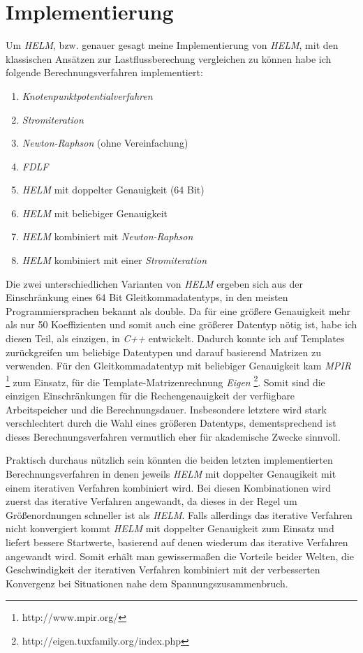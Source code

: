 \documentclass[12pt,a4paper]{article}
\begin{document}
	\section{Implementierung}
	\label{sec:implementierung}
	
	Um \emph{HELM}, bzw. genauer gesagt meine Implementierung von \emph{HELM}, mit den klassischen Ansätzen zur Lastflussberechung vergleichen zu können habe ich folgende Berechnungsverfahren implementiert:
	\begin{enumerate}
		\item \emph{Knotenpunktpotentialverfahren}
		\item \emph{Stromiteration}
		\item \emph{Newton-Raphson} (ohne Vereinfachung)
		\item \emph{FDLF}
		\item \emph{HELM} mit doppelter Genauigkeit (64 Bit)
		\item \emph{HELM} mit beliebiger Genauigkeit
		\item \emph{HELM} kombiniert mit \emph{Newton-Raphson}
		\item \emph{HELM} kombiniert mit einer \emph{Stromiteration}
	\end{enumerate}
	
	Die zwei unterschiedlichen Varianten von \emph{HELM} ergeben sich aus der Einschränkung eines 64 Bit Gleitkommadatentyps, in den meisten Programmiersprachen bekannt als double. Da für eine größere Genauigkeit mehr als nur 50 Koeffizienten und somit auch eine größerer Datentyp nötig ist, habe ich diesen Teil, als einzigen, in \emph{C++} entwickelt. Dadurch konnte ich auf Templates zurückgreifen um beliebige Datentypen und darauf basierend Matrizen zu verwenden. Für den Gleitkommadatentyp mit beliebiger Genauigkeit kam \emph{MPIR} \footnote{http://www.mpir.org/} zum Einsatz, für die Template-Matrizenrechnung \emph{Eigen} \footnote{http://eigen.tuxfamily.org/index.php}. Somit sind die einzigen Einschränkungen für die Rechengenauigkeit der verfügbare Arbeitspeicher und die Berechnungsdauer. Insbesondere letztere wird stark verschlechtert durch die Wahl eines größeren Datentyps, dementsprechend ist dieses Berechnungsverfahren vermutlich eher für akademische Zwecke sinnvoll.
	
	Praktisch durchaus nützlich sein könnten die beiden letzten implementierten Berechnungsverfahren in denen jeweils \emph{HELM} mit doppelter Genaugikeit mit einem iterativen Verfahren kombiniert wird. Bei diesen Kombinationen wird zuerst das iterative Verfahren angewandt, da dieses in der Regel um Größenordnungen schneller ist als \emph{HELM}. Falls allerdings das iterative Verfahren nicht konvergiert kommt \emph{HELM} mit doppelter Genauigkeit zum Einsatz und liefert bessere Startwerte, basierend auf denen wiederum das iterative Verfahren angewandt wird. Somit erhält man gewissermaßen die Vorteile beider Welten, die Geschwindigkeit der iterativen Verfahren kombiniert mit der verbesserten Konvergenz bei Situationen nahe dem Spannungszusammenbruch.
	
\end{document}
